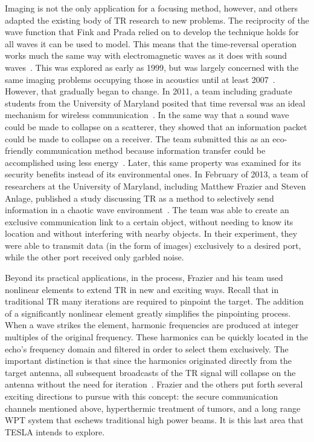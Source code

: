 Imaging is not the only application for a focusing method, however, and others adapted the existing body of TR research to new problems. The reciprocity of the wave function that Fink and Prada relied on to develop the technique holds for all waves it can be used to model. This means that the time-reversal operation works much the same way with electromagnetic waves as it does with sound waves~\cite{chambers_target_2007}. This was explored as early as 1999, but was largely concerned with the same imaging problems occupying those in acoustics until at least 2007~\cite{chambers_target_2007}. However, that gradually began to change. In 2011, a team including graduate students from the University of Maryland posited that time reversal was an ideal mechanism for wireless communication~\cite{wang_green_2011}. In the same way that a sound wave could be made to collapse on a scatterer, they showed that an information packet could be made to collapse on a receiver. The team submitted this as an eco-friendly communication method because information transfer could be accomplished using less energy~\cite{wang_green_2011}. Later, this same property was examined for its security benefits instead of its environmental ones. In February of 2013, a team of researchers at the University of Maryland, including Matthew Frazier and Steven Anlage, published a study discussing TR as a method to selectively send information in a chaotic wave environment~\cite{nltr-wave-chaotic,taddese_sensing_2010}. The team was able to create an exclusive communication link to a certain object, without needing to know its location and without interfering with nearby objects. In their experiment, they were able to transmit data (in the form of images) exclusively to a desired port, while the other port received only garbled noise.

Beyond its practical applications, in the process, Frazier and his team used nonlinear elements to extend TR in new and exciting ways. Recall that in traditional TR many iterations are required to pinpoint the target. The addition of a significantly nonlinear element greatly simplifies the pinpointing process. When a wave strikes the element, harmonic frequencies are produced at integer multiples of the original frequency. These harmonics can be quickly located in the echo's frequency domain and filtered in order to select them exclusively. The important distinction is that since the harmonics originated directly from the target antenna, all subsequent broadcasts of the TR signal will collapse on the antenna without the need for iteration~\cite{nltr-wave-chaotic}. Frazier and the others put forth several exciting directions to pursue with this concept: the secure communication channels mentioned above, hyperthermic treatment of tumors, and a long range WPT system that eschews traditional high power beams. It is this last area that TESLA intends to explore.
